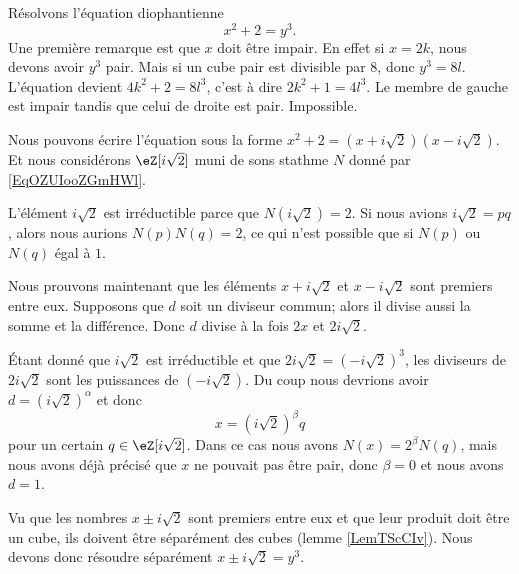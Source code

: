 \begin{example}     \label{ExmuQisZU}
    Résolvons l'équation diophantienne 
    \begin{equation}
        x^2+2=y^3.
    \end{equation}
    Une première remarque est que \( x\) doit être impair. En effet si \( x=2k\), nous devons avoir \( y^3\) pair. Mais si un cube pair est divisible par \( 8\), donc \( y^3=8l\). L'équation devient \( 4k^2+2=8l^3\), c'est à dire \( 2k^2+1=4l^3\). Le membre de gauche est impair tandis que celui de droite est pair. Impossible.

    Nous pouvons écrire l'équation sous la forme \( x^2+2=(x+i\sqrt{2})(x-i\sqrt{2})\). Et nous considérons \( \eZ[i\sqrt{2}]\) muni de sons stathme \( N\) donné par \eqref{EqOZUIooZGmHWl}.

    L'élément \( i\sqrt{2}\) est irréductible parce que \( N(i\sqrt{2})=2\). Si nous avions \( i\sqrt{2}=pq\), alors nous aurions \( N(p)N(q)=2\), ce qui n'est possible que si \( N(p)\) ou \( N(q)\) égal à \( 1\).

    Nous prouvons maintenant que les éléments \( x+i\sqrt{2}\) et \( x-i\sqrt{2}\) sont premiers entre eux. Supposons que \( d\) soit un diviseur commun; alors il divise aussi la somme et la différence. Donc \( d\) divise à la fois \( 2x\) et \( 2i\sqrt{2}\).

    Étant donné que \( i\sqrt{2}\) est irréductible et que \( 2i\sqrt{2}=(-i\sqrt{2})^3\), les diviseurs de \( 2i\sqrt{2}\) sont les puissances de \( (-i\sqrt{2})\). Du coup nous devrions avoir \( d=(i\sqrt{2})^{\alpha}\) et donc
    \begin{equation}
        x=(i\sqrt{2})^{\beta}q
    \end{equation}
    pour un certain \( q\in\eZ[i\sqrt{2}]\). Dans ce cas nous avons \( N(x)=2^{\beta}N(q)\), mais nous avons déjà précisé que \( x\) ne pouvait pas être pair, donc \( \beta=0\) et nous avons \( d=1\).

    Vu que les nombres \( x\pm i\sqrt{2}\) sont premiers entre eux et que leur produit doit être un cube, ils doivent être séparément des cubes (lemme \ref{LemTScCIv}). Nous devons donc résoudre séparément \( x\pm i\sqrt{2}=y^3\).


\end{example}
